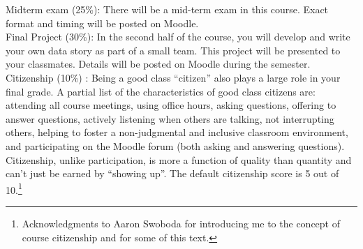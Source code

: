 \documentclass[10pt]{article}
\begin{document}
\noindent Midterm exam (25\%): There will be a mid-term exam in this course. Exact format and timing will be posted on Moodle. \\

\noindent Final Project (30\%): In the second half of the course, you will develop and write your own data story as part of a small team. This project will be presented to your classmates. Details will be posted on Moodle during the semester. \\


\noindent Citizenship (10\%) : Being a good class ``citizen'' also plays a large role in your final grade. A partial list of the characteristics of good class citizens are: attending all course meetings, using office hours, asking questions, offering to answer questions, actively listening when others are talking, not interrupting others, helping to foster a non-judgmental and inclusive classroom environment, and participating on the Moodle forum (both asking and answering questions). Citizenship, unlike participation, is more a function of quality than quantity and can't just be earned by ``showing up''. The default citizenship score is 5 out of 10.\footnote{Acknowledgments to Aaron Swoboda for introducing me to the concept of course citizenship and for some of this text.} \\


\end{document}
